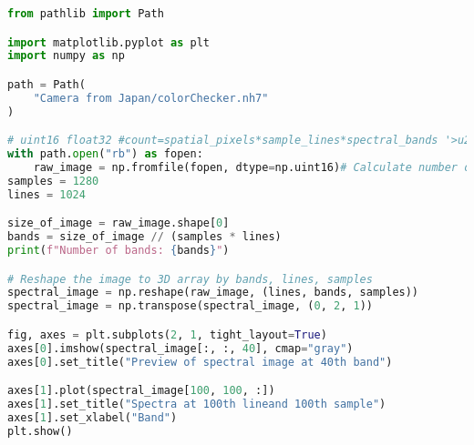 \begin{lstlisting}[language=python, caption=Load Japanese camera, label={code:load-jp}]
from pathlib import Path

import matplotlib.pyplot as plt
import numpy as np

path = Path(
    "Camera from Japan/colorChecker.nh7"
)

# uint16 float32 #count=spatial_pixels*sample_lines*spectral_bands '>u2' numpy.uint16
with path.open("rb") as fopen:
    raw_image = np.fromfile(fopen, dtype=np.uint16)# Calculate number of bands from size of image
samples = 1280
lines = 1024

size_of_image = raw_image.shape[0]
bands = size_of_image // (samples * lines)
print(f"Number of bands: {bands}")

# Reshape the image to 3D array by bands, lines, samples
spectral_image = np.reshape(raw_image, (lines, bands, samples))
spectral_image = np.transpose(spectral_image, (0, 2, 1))

fig, axes = plt.subplots(2, 1, tight_layout=True)
axes[0].imshow(spectral_image[:, :, 40], cmap="gray")
axes[0].set_title("Preview of spectral image at 40th band")

axes[1].plot(spectral_image[100, 100, :])
axes[1].set_title("Spectra at 100th lineand 100th sample")
axes[1].set_xlabel("Band")
plt.show()
\end{lstlisting}